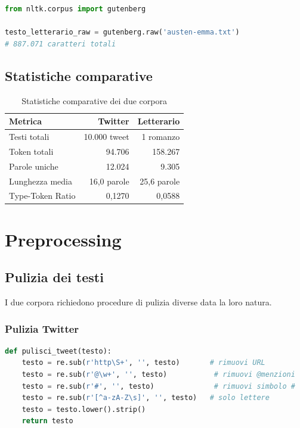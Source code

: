 \documentclass[12pt, a4paper]{article}
\begin{document}
\begin{lstlisting}[language=Python, caption=Caricamento corpus letterario]
from nltk.corpus import gutenberg

testo_letterario_raw = gutenberg.raw('austen-emma.txt')
# 887.071 caratteri totali
\end{lstlisting}

\subsection{Statistiche comparative}

\begin{table}[H]
\centering
\begin{tabular}{lrr}
\toprule
\textbf{Metrica} & \textbf{Twitter} & \textbf{Letterario} \\
\midrule
Testi totali         & 10.000 tweet    & 1 romanzo \\
Token totali         & 94.706          & 158.267 \\
Parole uniche        & 12.024          & 9.305 \\
Lunghezza media      & 16,0 parole     & 25,6 parole \\
Type-Token Ratio     & 0,1270          & 0,0588 \\
\bottomrule
\end{tabular}
\caption{Statistiche comparative dei due corpora}
\end{table}

\section{Preprocessing}

\subsection{Pulizia dei testi}

I due corpora richiedono procedure di pulizia diverse data la loro natura.

\subsubsection{Pulizia Twitter}

\begin{lstlisting}[language=Python, caption=Funzione di pulizia tweet]
def pulisci_tweet(testo):
    testo = re.sub(r'http\S+', '', testo)       # rimuovi URL
    testo = re.sub(r'@\w+', '', testo)           # rimuovi @menzioni
    testo = re.sub(r'#', '', testo)              # rimuovi simbolo #
    testo = re.sub(r'[^a-zA-Z\s]', '', testo)   # solo lettere
    testo = testo.lower().strip()
    return testo
\end{lstlisting}
\end{document}
